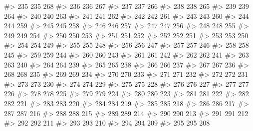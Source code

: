 \documentclass[
  letterpaper,
  DIV=11,
  numbers=noendperiod]{scrreprt}
\newenvironment{Shaded}{\begin{snugshade}}{\end{snugshade}}
\newcommand{\CommentTok}[1]{\textcolor[rgb]{0.37,0.37,0.37}{#1}}
\begin{document}
\begin{Shaded}
\begin{Highlighting}[]
\CommentTok{\#\textgreater{} 235 235  268}
\CommentTok{\#\textgreater{} 236 236  267}
\CommentTok{\#\textgreater{} 237 237  266}
\CommentTok{\#\textgreater{} 238 238  265}
\CommentTok{\#\textgreater{} 239 239  264}
\CommentTok{\#\textgreater{} 240 240  263}
\CommentTok{\#\textgreater{} 241 241  262}
\CommentTok{\#\textgreater{} 242 242  261}
\CommentTok{\#\textgreater{} 243 243  260}
\CommentTok{\#\textgreater{} 244 244  259}
\CommentTok{\#\textgreater{} 245 245  258}
\CommentTok{\#\textgreater{} 246 246  257}
\CommentTok{\#\textgreater{} 247 247  256}
\CommentTok{\#\textgreater{} 248 248  255}
\CommentTok{\#\textgreater{} 249 249  254}
\CommentTok{\#\textgreater{} 250 250  253}
\CommentTok{\#\textgreater{} 251 251  252}
\CommentTok{\#\textgreater{} 252 252  251}
\CommentTok{\#\textgreater{} 253 253  250}
\CommentTok{\#\textgreater{} 254 254  249}
\CommentTok{\#\textgreater{} 255 255  248}
\CommentTok{\#\textgreater{} 256 256  247}
\CommentTok{\#\textgreater{} 257 257  246}
\CommentTok{\#\textgreater{} 258 258  245}
\CommentTok{\#\textgreater{} 259 259  244}
\CommentTok{\#\textgreater{} 260 260  243}
\CommentTok{\#\textgreater{} 261 261  242}
\CommentTok{\#\textgreater{} 262 262  241}
\CommentTok{\#\textgreater{} 263 263  240}
\CommentTok{\#\textgreater{} 264 264  239}
\CommentTok{\#\textgreater{} 265 265  238}
\CommentTok{\#\textgreater{} 266 266  237}
\CommentTok{\#\textgreater{} 267 267  236}
\CommentTok{\#\textgreater{} 268 268  235}
\CommentTok{\#\textgreater{} 269 269  234}
\CommentTok{\#\textgreater{} 270 270  233}
\CommentTok{\#\textgreater{} 271 271  232}
\CommentTok{\#\textgreater{} 272 272  231}
\CommentTok{\#\textgreater{} 273 273  230}
\CommentTok{\#\textgreater{} 274 274  229}
\CommentTok{\#\textgreater{} 275 275  228}
\CommentTok{\#\textgreater{} 276 276  227}
\CommentTok{\#\textgreater{} 277 277  226}
\CommentTok{\#\textgreater{} 278 278  225}
\CommentTok{\#\textgreater{} 279 279  224}
\CommentTok{\#\textgreater{} 280 280  223}
\CommentTok{\#\textgreater{} 281 281  222}
\CommentTok{\#\textgreater{} 282 282  221}
\CommentTok{\#\textgreater{} 283 283  220}
\CommentTok{\#\textgreater{} 284 284  219}
\CommentTok{\#\textgreater{} 285 285  218}
\CommentTok{\#\textgreater{} 286 286  217}
\CommentTok{\#\textgreater{} 287 287  216}
\CommentTok{\#\textgreater{} 288 288  215}
\CommentTok{\#\textgreater{} 289 289  214}
\CommentTok{\#\textgreater{} 290 290  213}
\CommentTok{\#\textgreater{} 291 291  212}
\CommentTok{\#\textgreater{} 292 292  211}
\CommentTok{\#\textgreater{} 293 293  210}
\CommentTok{\#\textgreater{} 294 294  209}
\CommentTok{\#\textgreater{} 295 295  208}

\end{Highlighting}
\end{Shaded}
\end{document}
